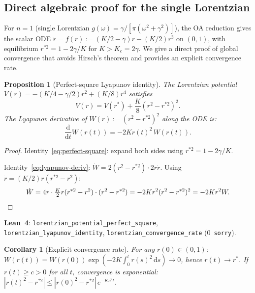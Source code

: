 \documentclass[11pt,a4paper]{article}
\newtheorem{proposition}[theorem]{Proposition}
\newtheorem{corollary}[theorem]{Corollary}
\theoremstyle{definition}
\begin{document}
\subsection{Direct algebraic proof for the single Lorentzian}\label{sec:lorentzian-direct}

For $n = 1$ (single Lorentzian $g(\omega) = \gamma/[\pi(\omega^2+\gamma^2)]$), the OA reduction gives the scalar ODE $\dot{r} = f(r) := (K/2-\gamma)r - (K/2)r^3$ on $(0,1)$, with equilibrium $r^{*2} = 1 - 2\gamma/K$ for $K > K_c = 2\gamma$. We give a direct proof of global convergence that avoids Hirsch's theorem and provides an explicit convergence rate.

\begin{proposition}[Perfect-square Lyapunov identity]\label{prop:perfect-square}
The Lorentzian potential $V(r) = -(K/4-\gamma/2)r^2 + (K/8)r^4$ satisfies
\begin{equation}\label{eq:perfect-square}
V(r) = V(r^*) + \frac{K}{8}(r^2 - r^{*2})^2.
\end{equation}
The Lyapunov derivative of $W(r) := (r^2 - r^{*2})^2$ along the ODE is:
\begin{equation}\label{eq:lyapunov-deriv}
\frac{\mathrm{d}}{\mathrm{d}t}W(r(t)) = -2Kr(t)^2\,W(r(t)).
\end{equation}
\end{proposition}

\begin{proof}
Identity~\eqref{eq:perfect-square}: expand both sides using $r^{*2} = 1-2\gamma/K$.

Identity~\eqref{eq:lyapunov-deriv}: $\dot{W} = 2(r^2-r^{*2})\cdot 2r\dot{r}$. Using $\dot{r} = (K/2)r(r^{*2}-r^2)$:
\[
\dot{W} = 4r\cdot\tfrac{K}{2}r(r^{*2}-r^2)\cdot(r^2-r^{*2}) = -2Kr^2(r^2-r^{*2})^2 = -2Kr^2 W. \qedhere
\]
\end{proof}

\textbf{Lean~4}: \texttt{lorentzian\_potential\_perfect\_square}, \texttt{lorentzian\_lyapunov\_identity}, \texttt{lorentzian\_convergence\_rate} (0~\texttt{sorry}).

\begin{corollary}[Explicit convergence rate]\label{cor:convergence-rate}
For any $r(0) \in (0,1)$: $W(r(t)) = W(r(0))\exp\!\left(-2K\int_0^t r(s)^2\,\mathrm{d}s\right) \to 0$, hence $r(t) \to r^*$. If $r(t) \geq c > 0$ for all $t$, convergence is exponential: $|r(t)^2 - r^{*2}| \leq |r(0)^2 - r^{*2}|\,e^{-Kc^2 t}$.
\end{corollary}
\end{document}

